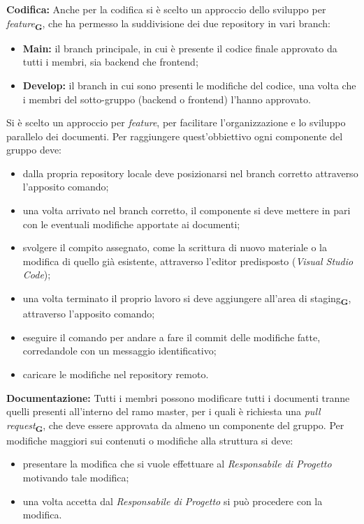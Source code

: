 \textbf{Codifica:} Anche per la codifica si è scelto un approccio dello sviluppo per \textit{feature}\textsubscript{\textbf{G}}, che ha permesso la suddivisione dei due repository in vari branch:
\begin{itemize}
    \renewcommand\labelitemi{-}
    \item \textbf{Main:} il branch principale, in cui è presente il codice finale approvato da tutti i membri, sia backend che frontend;
    \item \textbf{Develop:} il branch in cui sono presenti le modifiche del codice, una volta che i membri del sotto-gruppo (backend o frontend) l'hanno approvato.
\end{itemize}
Si è scelto un approccio per \textit{feature}, per facilitare l'organizzazione e lo sviluppo parallelo dei documenti. Per raggiungere quest'obbiettivo ogni componente del gruppo deve:
\begin{itemize}
    \renewcommand\labelitemi{-}
    \item dalla propria repository locale deve posizionarsi nel branch corretto attraverso l'apposito comando;
    \item una volta arrivato nel branch corretto, il componente si deve mettere in pari con le eventuali modifiche apportate ai documenti;
    \item svolgere il compito assegnato, come la scrittura di nuovo materiale o la modifica di quello già esistente, attraverso l'editor predisposto (\textit{Visual Studio Code});
    \item una volta terminato il proprio lavoro si deve aggiungere all'area di staging\textsubscript{\textbf{G}}, attraverso l'apposito comando;
    \item eseguire il comando per andare a fare il commit delle modifiche fatte, corredandole con un messaggio identificativo;
    \item caricare le modifiche nel repository remoto.
\end{itemize}
\textbf{Documentazione:}
Tutti i membri possono modificare tutti i documenti tranne quelli presenti all'interno del ramo master, per i quali è richiesta una \textit{pull request}\textsubscript{\textbf{G}}, che deve essere approvata da almeno un componente del gruppo.
Per modifiche maggiori sui contenuti o modifiche alla struttura si deve:
\begin{itemize}
    \renewcommand\labelitemi{-}
    \item presentare la modifica che si vuole effettuare al \textit{Responsabile di Progetto} motivando tale modifica;
    \item una volta accetta dal \textit{Responsabile di Progetto} si può procedere con la modifica.
\end{itemize}
